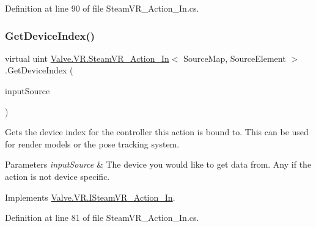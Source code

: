 Definition at line 90 of file Steam\+V\+R\+\_\+\+Action\+\_\+\+In.\+cs.

\mbox{\label{class_valve_1_1_v_r_1_1_steam_v_r___action___in_a21f1b8a683a6950f2e2cd1a2bbe42acc}} 
\subsubsection{\texorpdfstring{GetDeviceIndex()}{GetDeviceIndex()}}
{\footnotesize\ttfamily virtual uint \mbox{\hyperlink{class_valve_1_1_v_r_1_1_steam_v_r___action___in}{Valve.\+V\+R.\+Steam\+V\+R\+\_\+\+Action\+\_\+\+In}}$<$ Source\+Map, Source\+Element $>$.Get\+Device\+Index (\begin{DoxyParamCaption}\item[{\mbox{\hyperlink{namespace_valve_1_1_v_r_a82e5bf501cc3aa155444ee3f0662853f}{Steam\+V\+R\+\_\+\+Input\+\_\+\+Sources}}}]{input\+Source }\end{DoxyParamCaption})\hspace{0.3cm}{\ttfamily [virtual]}}



Gets the device index for the controller this action is bound to. This can be used for render models or the pose tracking system. 


\begin{DoxyParams}{Parameters}
{\em input\+Source} & The device you would like to get data from. Any if the action is not device specific.\\
\hline
\end{DoxyParams}


Implements \mbox{\hyperlink{interface_valve_1_1_v_r_1_1_i_steam_v_r___action___in_ab21c1d79f19d11a4d3ee53d373c62cb4}{Valve.\+V\+R.\+I\+Steam\+V\+R\+\_\+\+Action\+\_\+\+In}}.



Definition at line 81 of file Steam\+V\+R\+\_\+\+Action\+\_\+\+In.\+cs.

\mbox{\label{class_valve_1_1_v_r_1_1_steam_v_r___action___in_a330a9cf6a0b63e08804318d49e43509e}} 
